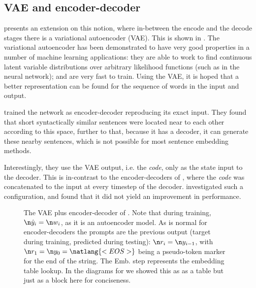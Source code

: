 {\subsection{VAE and encoder-decoder}\label{sec:vae-and-encoder-decoder}
 presents an extension on this notion,
where in-between the encode and the decode stages there is a variational autoencoder (VAE).
This is shown in .
The variational autoencoder  has been demonstrated to have very good properties in a number of machine learning applications: they are able to work to find continuous latent variable distributions over arbitrary likelihood functions (such as in the neural network); and are very fast to train.
Using the VAE, it is hoped that a better representation can be found for the sequence of words in the input and output.


\textcite{Bowman2015SmoothGeneration} trained the network as encoder-decoder reproducing its exact input.
They found that short syntactically similar sentences were located near to each other according to this space,
further to that, because it has a decoder, it can generate these nearby sentences,
which is not possible for most sentence embedding methods.

Interestingly, they use the VAE output, i.e. the \emph{code}, only as the state input to the decoder.
This is in-contrast to the encoder-decoders of \textcite{cho-EtAl:2014:EMNLP2014},
where the \emph{code} was concatenated to the input at every timestep of the decoder.
\textcite{Bowman2015SmoothGeneration} investigated such a configuration,
and found that it did not yield an improvement in performance.



\begin{figure}
	\caption{The VAE plus encoder-decoder of \textcite{Bowman2015SmoothGeneration}.
		Note that during training, $\n \hat{y}_i=\n w_i$, as it is an autoencoder model.
		As is normal for encoder-decoders the prompts are the previous output (target during training, predicted during testing): $\n r_i=\n y_{i-1}$,
		with $\n r_1= \n y_0= \natlang{<EOS>}$ being a pseudo-token marker for the end of the string.
		The Emb. step represents the embedding table lookup. In the diagrams for   we showed this as  as a table but just as a block here for conciseness.
	}
	\label{fig:bowman}
	
	\resizebox{\textwidth}{!}{\begin{tikzpicture}[]
		

\end{tikzpicture}}
\end{figure}}
